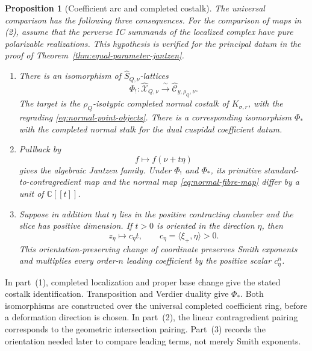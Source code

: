 \documentclass[11pt]{amsart}
\newtheorem{proposition}[theorem]{Proposition}
\theoremstyle{definition}
\theoremstyle{remark}
\newcommand{\C}{\mathbb C}
\newcommand{\A}{\C[[t]]}
\begin{document}
\begin{proposition}[Coefficient arc and completed costalk]
\label{prop:general-coefficient-arc}
The universal comparison has the following three consequences.
For the comparison of maps in \textup{(2)}, assume that the perverse IC
summands of the localized complex have pure polarizable realizations.
This hypothesis is verified for the principal datum in the proof of
Theorem~\ref{thm:equal-parameter-jantzen}.
\begin{enumerate}
\item There is an isomorphism of $\widehat S_{Q,\nu}$-lattices
\begin{equation}\label{eq:universal-coefficient-family}
 \Phi_!: \widehat{\mathcal X}_{Q,\nu}
 \xrightarrow{\ \sim\ }
 \widehat{\mathcal C}_{y,\rho_Q,\nu}.
\end{equation}
The target is the $\rho_Q$-isotypic completed normal costalk of
$K_{\sigma,r}$, with the regrading \eqref{eq:normal-point-objects}.
There is a corresponding isomorphism $\Phi_*$ with the completed
normal stalk for the dual cuspidal coefficient datum.

\item Pullback by
\[
 f\longmapsto f(\nu+t\eta)
\]
gives the algebraic Jantzen family.  Under $\Phi_!$ and $\Phi_*$, its
primitive standard-to-contragredient map and the normal map
\eqref{eq:normal-fibre-map} differ by a unit of $\A$.

\item Suppose in addition that $\eta$ lies in the positive contracting
chamber and the slice has positive dimension.  If $t>0$ is oriented in the direction $\eta$, then
\begin{equation}\label{eq:positive-coefficient-arc}
 z_\eta\longmapsto c_\eta t,
 \qquad c_\eta=\langle\xi_+,\eta\rangle>0.
\end{equation}
This orientation-preserving change of coordinate preserves Smith exponents
and multiplies every order-$n$ leading coefficient by the positive scalar
$c_\eta^n$.
\end{enumerate}
\end{proposition}

In part~(1), completed localization and proper base change give the stated
costalk identification.  Transposition and Verdier duality give $\Phi_*$.
Both isomorphisms are constructed over the universal completed coefficient
ring, before a deformation direction is chosen.  In part~(2), the linear
contragredient pairing corresponds to the geometric intersection pairing.
Part~(3) records the orientation needed later to compare leading terms, not
merely Smith exponents.
\end{document}
